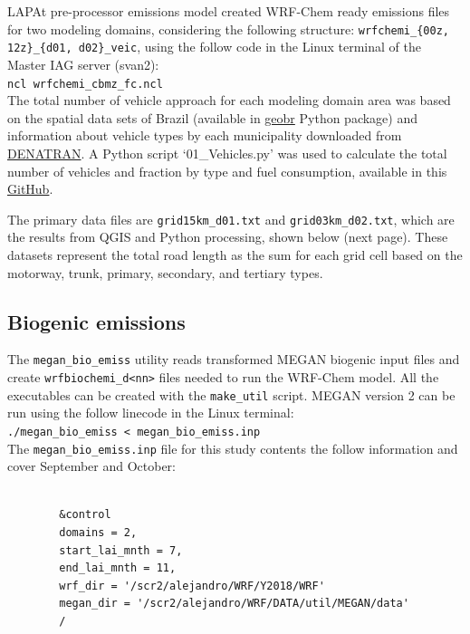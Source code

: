 {\scriptsize }
LAPAt pre-processor emissions model created WRF-Chem ready emissions files for two modeling domains, considering the following structure: \verb|wrfchemi_{00z, 12z}_{d01, d02}_veic|, using the follow code in the Linux terminal of the Master IAG server (svan2): \\
		\verb|ncl wrfchemi_cbmz_fc.ncl|\\
The total number of vehicle approach for each modeling domain area was based on the spatial data sets of Brazil (available in \href{https://github.com/ipeaGIT/geobr}{geobr} Python package) and information about vehicle types by each municipality downloaded from \href{https://www.gov.br/infraestrutura/pt-br/assuntos/transito/conteudo-denatran/frota-de-veiculos-2018}{DENATRAN}.
A Python script `01\_Vehicles.py' was used to calculate the total number of vehicles and fraction by type and fuel consumption, available in this \href{https://github.com/adelgadop/Master_Dissertation}{GitHub}.

The primary data files are \verb|grid15km_d01.txt| and \verb|grid03km_d02.txt|, which are the results from QGIS and Python processing, shown below (next page).
These datasets represent the total road length as the sum for each grid cell based on the motorway, trunk, primary, secondary, and tertiary types.


\subsection{Biogenic emissions}\label{ap: biogenic}
The \verb|megan_bio_emiss| utility reads transformed MEGAN biogenic input files and create \verb|wrfbiochemi_d<nn>| files needed to run the WRF-Chem model.
	All the executables can be created with the \verb|make_util| script.
	MEGAN version 2 can be run using the follow linecode in the Linux terminal: \\
	\verb|./megan_bio_emiss < megan_bio_emiss.inp|\\
	The \verb|megan_bio_emiss.inp| file for this study contents the follow information and cover September and October:
	
	\begin{verbatim}
	
		&control
		domains = 2,
		start_lai_mnth = 7,
		end_lai_mnth = 11,
		wrf_dir = '/scr2/alejandro/WRF/Y2018/WRF'
		megan_dir = '/scr2/alejandro/WRF/DATA/util/MEGAN/data'
		/
	\end{verbatim}
	
